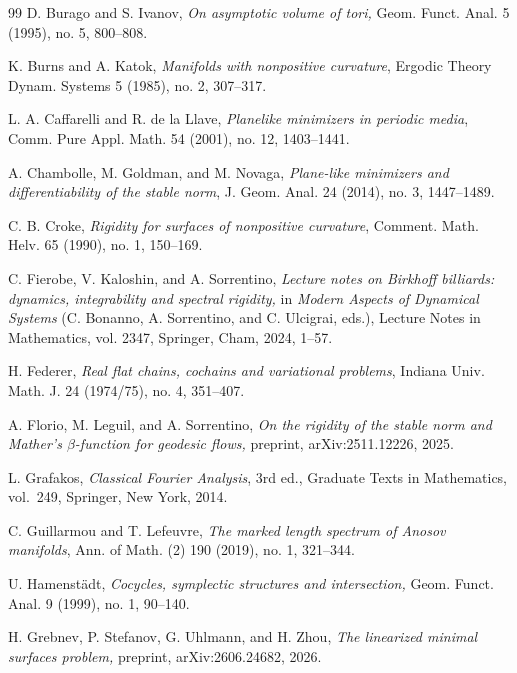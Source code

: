 \documentclass[11pt]{amsart}
\theoremstyle{remark}
\theoremstyle{definition}
\begin{document}
\begin{thebibliography}{99}
		 D. Burago and S. Ivanov, {\em On asymptotic volume of tori,} Geom. Funct. Anal. 5 (1995), no. 5, 800--808.
		
		 K. Burns and A. Katok, \emph{Manifolds with nonpositive curvature}, Ergodic Theory Dynam. Systems 5 (1985), no. 2, 307--317.
		
		L. A. Caffarelli and R. de la Llave,
		\emph{Planelike minimizers in periodic media},
		Comm. Pure Appl. Math. 54 (2001), no. 12, 1403--1441.
		
		A. Chambolle, M. Goldman, and M. Novaga,
		\emph{Plane-like minimizers and differentiability of the stable norm},
		J. Geom. Anal. 24 (2014), no. 3, 1447--1489.
		
		 C. B. Croke, \emph{Rigidity for surfaces of nonpositive curvature}, Comment. Math. Helv. 65 (1990), no. 1, 150--169.
		
		 C. Fierobe, V. Kaloshin, and A. Sorrentino, {\em Lecture notes on Birkhoff billiards: dynamics, integrability and spectral rigidity,} in {\em Modern Aspects of Dynamical Systems} (C. Bonanno, A. Sorrentino, and C. Ulcigrai, eds.), Lecture Notes in Mathematics, vol. 2347, Springer, Cham, 2024, 1--57.
		
		H. Federer,
		\emph{Real flat chains, cochains and variational problems},
		Indiana Univ. Math. J. 24 (1974/75), no. 4, 351--407.
		
		
		
		 A. Florio, M. Leguil, and A. Sorrentino, {\em On the rigidity of the stable norm and Mather's $\beta$-function for geodesic flows,} preprint, arXiv:2511.12226, 2025.
		
		{ L. Grafakos, \emph{Classical Fourier Analysis}, 3rd ed.,
			Graduate Texts in Mathematics, vol.~249, Springer, New York, 2014.}
		
		 C. Guillarmou and T. Lefeuvre, \emph{The marked length spectrum of Anosov manifolds}, Ann. of Math. (2) 190 (2019), no. 1, 321--344. 
		
		 U. Hamenst\"adt, {\em Cocycles, symplectic structures and intersection,} Geom. Funct. Anal. 9 (1999), no. 1, 90--140.
		
		 H. Grebnev, P. Stefanov, G. Uhlmann, and H. Zhou, {\em The linearized minimal surfaces problem,} preprint, arXiv:2606.24682, 2026.
		

\end{thebibliography}
\end{document}
